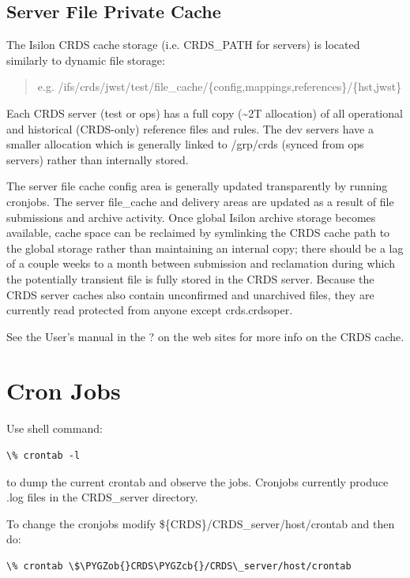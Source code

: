 \documentclass[letterpaper,10pt,english]{sphinxmanual}
\def\PYGZob{\char`\{}
\def\PYGZcb{\char`\}}
\begin{document}
\section{Server File Private Cache}
\label{server_guide:server-file-private-cache}
The Isilon CRDS cache storage (i.e. CRDS\_PATH for servers) is located similarly to dynamic file storage:
\begin{quote}

e.g. /ifs/crds/jwst/test/file\_cache/\{config,mappings,references\}/\{hst,jwst\}
\end{quote}

Each CRDS server (test or ops) has a full copy (\textasciitilde{}2T allocation) of all operational and historical (CRDS-only)
reference files and rules. The dev servers have a smaller allocation which is generally linked to /grp/crds
(synced from ops servers) rather than internally stored.

The server file cache config area is generally updated transparently by running cronjobs.   The server file\_cache
and delivery areas are updated as a result of file submissions and archive activity.  Once global Isilon archive storage
becomes available, cache space can be reclaimed by symlinking the CRDS cache path to the global storage rather than
maintaining an internal copy;  there should be a lag of a couple weeks to a month between submission and reclamation
during which the potentially transient file is fully stored in the CRDS server.   Because the CRDS server caches also
contain unconfirmed and unarchived files,  they are currently read protected from anyone except crds.crdsoper.

See the User's manual in the ? on the web sites for more info on the CRDS cache.


\chapter{Cron Jobs}
\label{server_guide:cron-jobs}
Use shell command:

\begin{Verbatim}[commandchars=\\\{\}]
\% crontab -l
\end{Verbatim}

to dump the current crontab and observe the jobs.   Cronjobs currently produce .log files in the CRDS\_server directory.

To change the cronjobs modify \$\{CRDS\}/CRDS\_server/host/crontab and then do:

\begin{Verbatim}[commandchars=\\\{\}]
\% crontab \$\PYGZob{}CRDS\PYGZcb{}/CRDS\_server/host/crontab
\end{Verbatim}
\end{document}
